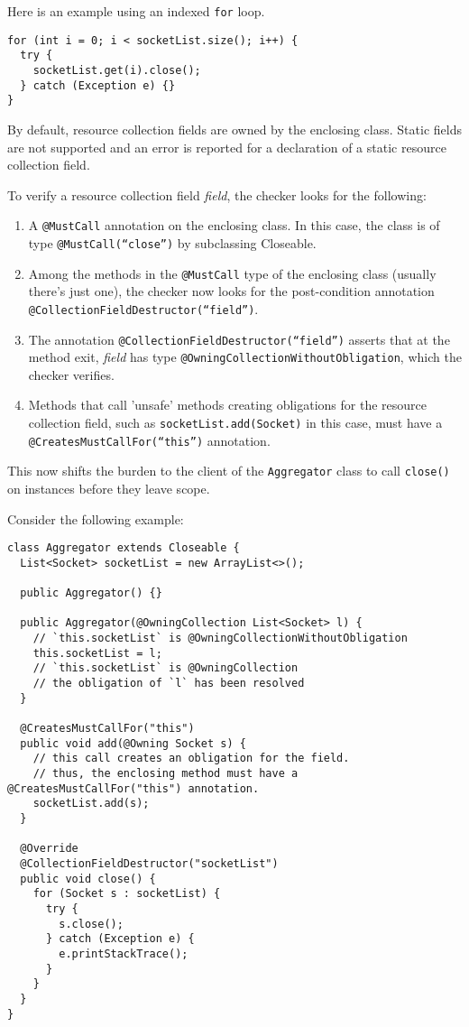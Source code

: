 Here is an example using an indexed \texttt{for} loop.

\begin{verbatim}
for (int i = 0; i < socketList.size(); i++) {
  try {
    socketList.get(i).close();
  } catch (Exception e) {}
}
\end{verbatim}

By default, resource collection fields are owned by the enclosing class. Static fields are not supported and an error is reported for a declaration of a static resource collection field.

To verify a resource collection field \textit{field}, the checker looks for the following:
\begin{enumerate}
  \item A \texttt{@MustCall} annotation on the enclosing class. In this case, the class is of type \texttt{@MustCall(``close'')} by subclassing Closeable.
  \item Among the methods in the \texttt{@MustCall} type of the enclosing class (usually there's just one), the checker now looks for the post-condition annotation \texttt{@CollectionFieldDestructor(``field'')}.
  \item The annotation \texttt{@CollectionFieldDestructor(``field'')} asserts that at the method exit, \textit{field} has type \texttt{@OwningCollectionWithoutObligation}, which the checker verifies.
  \item Methods that call 'unsafe' methods creating obligations for the resource collection field, such as \texttt{socketList.add(Socket)} in this case, must have a \texttt{@CreatesMustCallFor(``this'')} annotation.
\end{enumerate}

This now shifts the burden to the client of the \texttt{Aggregator} class to call \texttt{close()} on instances before they leave scope.

Consider the following example:

\begin{verbatim}
class Aggregator extends Closeable {
  List<Socket> socketList = new ArrayList<>();

  public Aggregator() {}

  public Aggregator(@OwningCollection List<Socket> l) {
    // `this.socketList` is @OwningCollectionWithoutObligation
    this.socketList = l;
    // `this.socketList` is @OwningCollection
    // the obligation of `l` has been resolved
  }

  @CreatesMustCallFor("this")
  public void add(@Owning Socket s) {
    // this call creates an obligation for the field.
    // thus, the enclosing method must have a @CreatesMustCallFor("this") annotation.
    socketList.add(s);
  }

  @Override
  @CollectionFieldDestructor("socketList")
  public void close() {
    for (Socket s : socketList) {
      try {
        s.close();
      } catch (Exception e) {
        e.printStackTrace();
      }
    }
  }
}
\end{verbatim}


